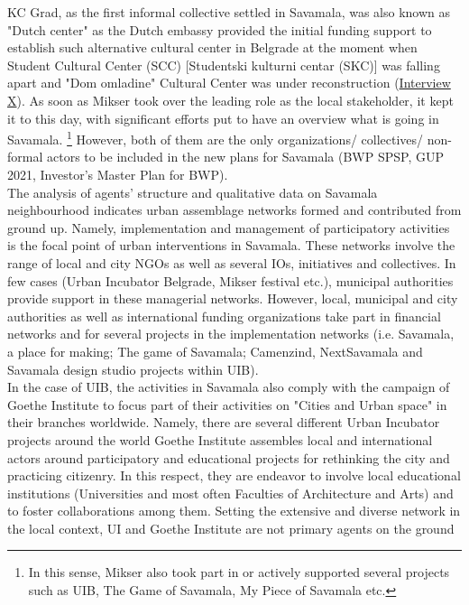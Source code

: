 \documentclass[11pt]{report}
\begin{document}
KC Grad, as the first informal collective settled in Savamala, was also known as "Dutch center" as the Dutch embassy provided the initial funding support to establish such alternative cultural center in Belgrade at the moment when Student Cultural Center (SCC) [Studentski kulturni centar (SKC)] was falling apart and "Dom omladine" Cultural Center was under reconstruction (\href{InterviewX}{Interview X}).
As soon as Mikser took over the leading role as the local stakeholder, it kept it to this day, with significant efforts put to have an overview what is going in Savamala.
\footnote{In this sense, Mikser also took part in or actively supported several projects such as UIB, The Game of Savamala, My Piece of Savamala etc.}
However, both of them are the only organizations/ collectives/ non-formal actors to be included in the new plans for Savamala (BWP SPSP, GUP 2021, Investor's Master Plan for BWP).
\\

The analysis of agents’ structure and qualitative data on Savamala neighbourhood indicates urban assemblage networks formed and contributed from ground up.
Namely, implementation and management of participatory activities is the focal point of urban interventions in Savamala.
These networks involve the range of local and city NGOs as well as several IOs, initiatives and collectives. In few cases (Urban Incubator Belgrade, Mikser festival etc.), municipal authorities provide support in these managerial networks.
However, local, municipal and city authorities as well as international funding organizations take part in financial networks and for several projects in the implementation networks (i.e. Savamala, a place for making; The game of Savamala; Camenzind, NextSavamala and Savamala design studio projects within UIB).
\\

In the case of UIB, the activities in Savamala also comply with the campaign of Goethe Institute to focus part of their activities on "Cities and Urban space" in their branches worldwide. Namely, there are several different Urban Incubator projects around the world
Goethe Institute assembles local and international actors around participatory and educational projects for rethinking the city and practicing citizenry.
In this respect, they are endeavor to involve local educational institutions (Universities and most often Faculties of Architecture and Arts) and to foster collaborations among them.
Setting the extensive and diverse network in the local context, UI and Goethe Institute are not primary agents on the ground
\\
\end{document}
